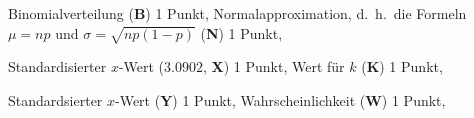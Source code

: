 \begin{bewertung}
Binomialverteilung (\textbf{B}) 1 Punkt,
Normalapproximation, d.~h.~die Formeln $\mu=np$ und $\sigma=\sqrt{np(1-p)}$
(\textbf{N}) 1 Punkt,
\begin{teilaufgaben}
\item
Standardisierter $x$-Wert ($3.0902$, \textbf{X}) 1 Punkt,
Wert für $k$ (\textbf{K}) 1 Punkt,
\item
Standardsierter $x$-Wert (\textbf{Y}) 1 Punkt,
Wahrscheinlichkeit (\textbf{W}) 1 Punkt,
\end{teilaufgaben}
\end{bewertung}

